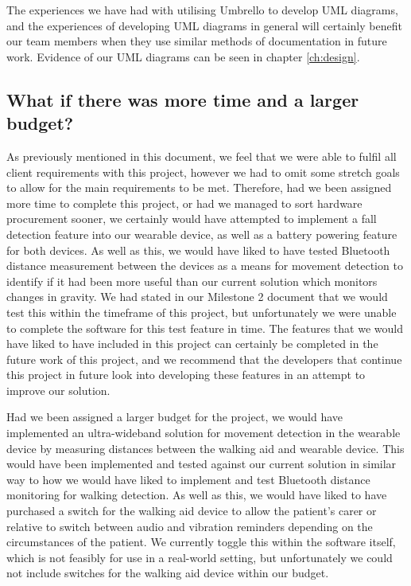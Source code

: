                 The experiences we have had with utilising Umbrello to develop UML diagrams, and the experiences of developing UML diagrams in general will certainly benefit our team members when they use similar methods of documentation in future work. Evidence of our UML diagrams can be seen in chapter \ref{ch:design}.
                
        \subsection{What if there was more time and a larger budget?}

            As previously mentioned in this document, we feel that we were able to fulfil all client requirements with this project, however we had to omit some stretch goals to allow for the main requirements to be met. Therefore, had we been assigned more time to complete this project, or had we managed to sort hardware procurement sooner, we certainly would have attempted to implement a fall detection feature into our wearable device, as well as a battery powering feature for both devices. As well as this, we would have liked to have tested Bluetooth distance measurement between the devices as a means for movement detection to identify if it had been more useful than our current solution which monitors changes in gravity. We had stated in our Milestone 2 document \cite{mile2} that we would test this within the timeframe of this project, but unfortunately we were unable to complete the software for this test feature in time. The features that we would have liked to have included in this project can certainly be completed in the future work of this project, and we recommend that the developers that continue this project in future look into developing these features in an attempt to improve our solution.

            Had we been assigned a larger budget for the project, we would have implemented an ultra-wideband solution for movement detection in the wearable device by measuring distances between the walking aid and wearable device. This would have been implemented and tested against our current solution in similar way to how we would have liked to implement and test Bluetooth distance monitoring for walking detection. As well as this, we would have liked to have purchased a switch for the walking aid device to allow the patient's carer or relative to switch between audio and vibration reminders depending on the circumstances of the patient. We currently toggle this within the software itself, which is not feasibly for use in a real-world setting, but unfortunately we could not include switches for the walking aid device within our budget.

